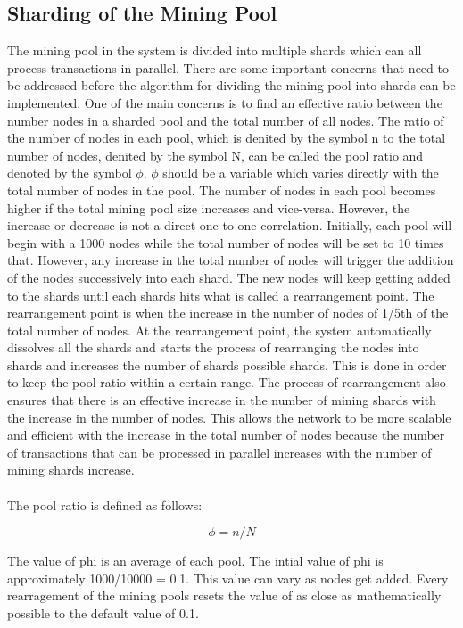 \documentclass[a4paper,twoside,phd]{BYUPhys}
\begin{document}
\subsection{Sharding of the Mining Pool}
The mining pool in the system is divided into multiple shards which can all process transactions in parallel. There are some important concerns that need to be addressed before the algorithm for dividing the mining pool into shards can be implemented. One of the main concerns is to find an effective ratio between the number nodes in a sharded pool and the total number of all nodes. The ratio of the number of nodes in each pool, which is denited by the symbol n to the total number of nodes, denited by the symbol N, can be called the pool ratio and denoted by the symbol $\phi$. $\phi$ should be a variable which varies directly with the total number of nodes in the pool. The number of nodes in each pool becomes higher if the total mining pool size increases and vice-versa. However, the increase or decrease is not a direct one-to-one correlation. Initially, each pool will begin with a 1000 nodes while the total number of nodes will be set to 10 times that. However, any increase in the total number of nodes will trigger the addition of the nodes successively into each shard. The new nodes will keep getting added to the shards until each shards hits what is called a rearrangement point. The rearrangement point is when the increase in the number of nodes of 1/5th of the total number of nodes. At the rearrangement point, the system automatically dissolves all the shards and starts the process of rearranging the nodes into shards and increases the number of shards possible shards. This is done in order to keep the pool ratio within a certain range. The process of rearrangement also ensures that there is an effective increase in the number of mining shards with the increase in the number of nodes. This allows the network to be more scalable and efficient with the increase in the total number of nodes because the number of transactions that can be processed in parallel increases with the number of mining shards increase.
\\
\\
The pool ratio is defined as follows:

\[\phi = n/N\]

The value of phi is an average of each pool. The intial value of phi is approximately 1000/10000 = 0.1. This value can vary as nodes get added. Every rearragement of the mining pools resets the value of \phi as close as mathematically possible to the default value of 0.1.
\end{document}

